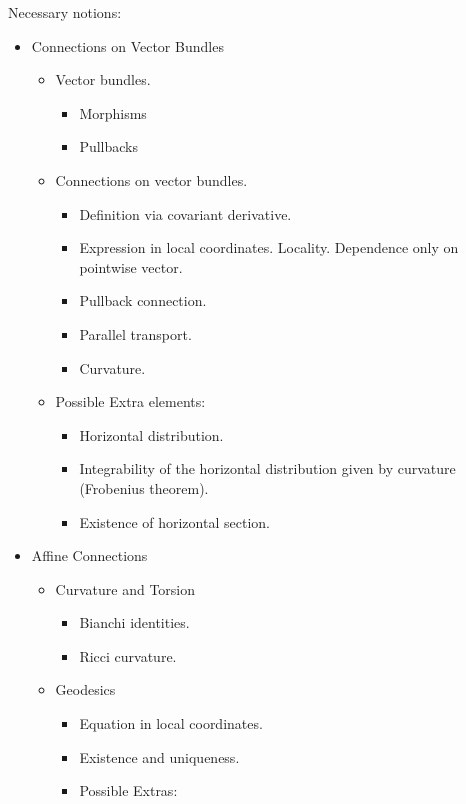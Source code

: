 \documentclass{report}
\theoremstyle{definition}
\begin{document}
Necessary notions:
\begin{itemize}
    \item Connections on Vector Bundles
    \begin{itemize}
        \item Vector bundles.
        \begin{itemize}
            \item Morphisms
            \item Pullbacks
        \end{itemize}
        \item Connections on vector bundles.
        \begin{itemize}
            \item Definition via covariant derivative.
            \item Expression in local coordinates. Locality. Dependence only on pointwise vector.
            \item Pullback connection.
            \item Parallel transport.
            \item Curvature.
        \end{itemize}
        \item Possible Extra elements:
        \begin{itemize}
            \item Horizontal distribution.
            \item Integrability of the horizontal distribution given by curvature (Frobenius theorem).
            \item Existence of horizontal section.
        \end{itemize}
    \end{itemize}
    \item Affine Connections
    \begin{itemize}
        \item Curvature and Torsion
        \begin{itemize}
            \item Bianchi identities.
            \item Ricci curvature.
        \end{itemize}
        \item Geodesics
        \begin{itemize}
            \item Equation in local coordinates.
            \item Existence and uniqueness.
            \item Possible Extras: 

\end{itemize}
\end{itemize}
\end{itemize}
\end{document}
